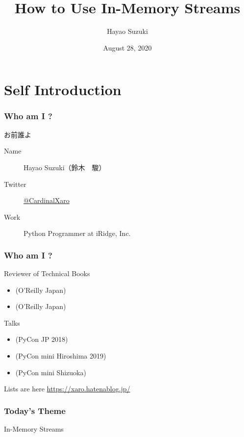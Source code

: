 \documentclass[dvipdfmx,12pt,notheorems]{beamer}
\title{How to Use In-Memory Streams}
\author[Hayao]{Hayao Suzuki}
\institute[PyCon JP 2020]{PyCon JP 2020}
\date{August 28, 2020}
\theoremstyle{definition}
\begin{document}
\begin{frame}[plain]\frametitle{}
\titlepage %
\end{frame}

\section{Self Introduction}

\begin{frame}\frametitle{Who am I ?}

\begin{block}{お前誰よ}
\begin{description}
\item[Name] Hayao Suzuki（鈴木　駿）
\item[Twitter] \href{https://twitter.com/CardinalXaro}{@CardinalXaro}
\item[Work] Python Programmer at iRidge, Inc.
\end{description}
\end{block}

\end{frame}

\begin{frame}\frametitle{Who am I ?}

\begin{block}{Reviewer of Technical Books}
\begin{itemize}
\item {}(O'Reilly Japan)
\item {}(O'Reilly Japan)
\end{itemize}
\end{block}

\begin{block}{Talks}
\begin{itemize}
\item {}(PyCon JP 2018)
\item {}(PyCon mini Hiroshima 2019)
\item {}(PyCon mini Shizuoka)
\end{itemize}
\end{block}
Lists are here  \url{https://xaro.hatenablog.jp/}
\end{frame}

\begin{frame}\frametitle{Today's Theme}
\begin{center}
\huge{In-Memory Streams}
\end{center}
\end{frame}
\end{document}
